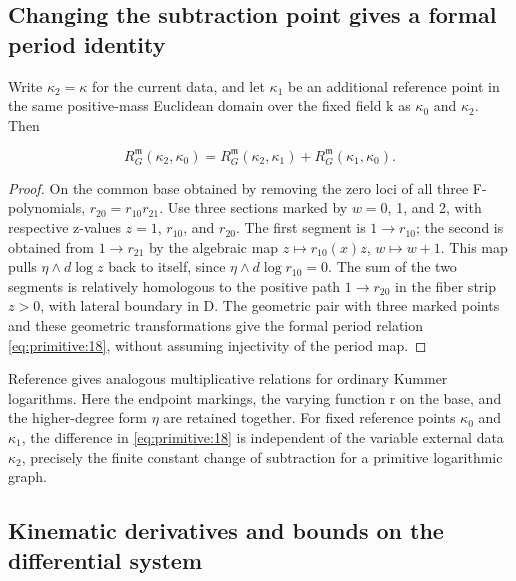 \documentclass[11pt,a4paper,oneside]{article}
\theoremstyle{plain}
\theoremstyle{definition}
\theoremstyle{remark}
\numberwithin{equation}{section}
\begin{document}
\subsection{Changing the subtraction point gives a formal period identity}\label{sec:primitive:6}

Write \(\kappa_2=\kappa\) for the current data, and let \(\kappa _1\) be an additional reference point in the same positive-mass Euclidean domain over the fixed field k as \(\kappa _0\) and \(\kappa_2\). Then

\begin{equation}
R_G^{\mathfrak m}(\kappa_2,\kappa_0)
 =R_G^{\mathfrak m}(\kappa_2,\kappa_1)
                         +R_G^{\mathfrak m}(\kappa_1,\kappa_0).              \label{eq:primitive:18}
\end{equation}

\begin{proof}

On the common base obtained by removing the zero loci of all three F-polynomials, \(r_{20}=r_{10}r_{21}\). Use three sections marked by \(w=0\), 1, and 2, with respective z-values \(z=1\), \(r_{10}\), and \(r_{20}\). The first segment is \(1\to r_{10}\); the second is obtained from \(1\to r_{21}\) by the algebraic map \(z\mapsto r_{10}(x)z\), \(w\mapsto w+1\). This map pulls \(\eta \wedge d\log  z\) back to itself, since \(\eta \wedge d\log  r_{10}=0\). The sum of the two segments is relatively homologous to the positive path \(1\to r_{20}\) in the fiber strip \(z>0\), with lateral boundary in D. The geometric pair with three marked points and these geometric transformations give the formal period relation \eqref{eq:primitive:18}, without assuming injectivity of the period map.

\end{proof}

Reference \cite{brownperiods} gives analogous multiplicative relations for ordinary Kummer logarithms. Here the endpoint markings, the varying function r on the base, and the higher-degree form \(\eta \) are retained together. For fixed reference points \(\kappa _0\) and \(\kappa _1\), the difference in \eqref{eq:primitive:18} is independent of the variable external data \(\kappa _2\), precisely the finite constant change of subtraction for a primitive logarithmic graph.


\subsection{Kinematic derivatives and bounds on the differential system}\label{sec:primitive:7}
\end{document}
